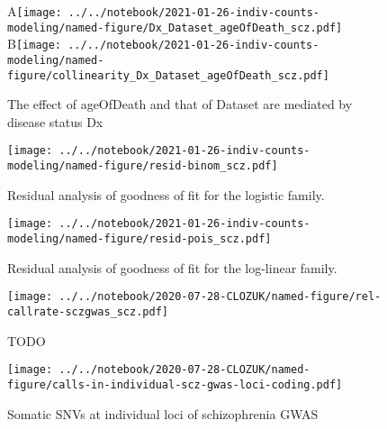 \documentclass[letterpaper]{article}
\begin{document}
\begin{figure}[p]
\begin{center}
A\texttt{[image: ../../notebook/2021-01-26-indiv-counts-modeling/named-figure/Dx\_Dataset\_ageOfDeath\_scz.pdf]}
B\texttt{[image: ../../notebook/2021-01-26-indiv-counts-modeling/named-figure/collinearity\_Dx\_Dataset\_ageOfDeath\_scz.pdf]}
\end{center}
\caption{
The effect of ageOfDeath and that of Dataset are mediated by disease status Dx
}
\label{fig:d-separation}
\end{figure}

\begin{figure}[p]
\texttt{[image: ../../notebook/2021-01-26-indiv-counts-modeling/named-figure/resid-binom\_scz.pdf]}
\caption{
Residual analysis of goodness of fit for the logistic family.
}
\label{fig:binomial-QQ}
\end{figure}

\begin{figure}[p]
\texttt{[image: ../../notebook/2021-01-26-indiv-counts-modeling/named-figure/resid-pois\_scz.pdf]}
\caption{
Residual analysis of goodness of fit for the log-linear family.
}
\label{fig:poisson-QQ}
\end{figure}

\begin{figure}[p]
\texttt{[image: ../../notebook/2020-07-28-CLOZUK/named-figure/rel-callrate-sczgwas\_scz.pdf]}
\caption{
TODO
}
\label{fig:scz-gwas-genes-vs-loci}
\end{figure}

\begin{figure}[p]
\texttt{[image: ../../notebook/2020-07-28-CLOZUK/named-figure/calls-in-individual-scz-gwas-loci-coding.pdf]}
\caption{
Somatic SNVs at individual loci of schizophrenia GWAS
}
\label{fig:indiv-scz-gwas-loci}
\end{figure}
\end{document}
